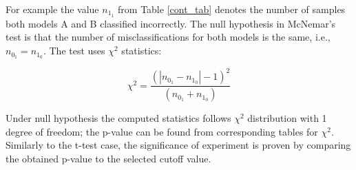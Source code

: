 For example the value $n_1_1$ from Table \ref{cont_tab} denotes the number of samples both models A and B classified incorrectly. The null hypothesis in McNemar's test is that the number of misclassifications for both models is the same, i.e., $n_0_1 = n_1_0$. The test uses $\chi^2$ statistics:

\begin{equation}
    \chi^2 = \frac{(|n_0_1 - n_1_0| - 1)^2}{(n_0_1 + n_1_0)}
\end{equation}

Under null hypothesis the computed statistics follows $\chi^2$ distribution with 1 degree of freedom; the p-value can be found from corresponding tables for $\chi^2$. Similarly to the t-test case, the significance of experiment is proven by comparing the obtained p-value to the selected cutoff value.

